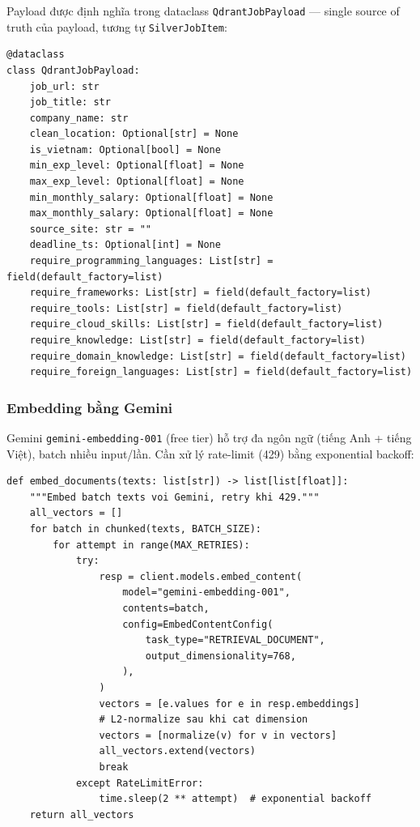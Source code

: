 Payload được định nghĩa trong dataclass \texttt{QdrantJobPayload} --- single
source of truth của payload, tương tự \texttt{SilverJobItem}:

\begin{lstlisting}[caption={\texttt{src/storage\_layer/Qdrant/schema/data\_class.py} --- QdrantJobPayload (trích đoạn)}, label={lst:qdrant-payload}]
@dataclass
class QdrantJobPayload:
    job_url: str
    job_title: str
    company_name: str
    clean_location: Optional[str] = None
    is_vietnam: Optional[bool] = None
    min_exp_level: Optional[float] = None
    max_exp_level: Optional[float] = None
    min_monthly_salary: Optional[float] = None
    max_monthly_salary: Optional[float] = None
    source_site: str = ""
    deadline_ts: Optional[int] = None
    require_programming_languages: List[str] = field(default_factory=list)
    require_frameworks: List[str] = field(default_factory=list)
    require_tools: List[str] = field(default_factory=list)
    require_cloud_skills: List[str] = field(default_factory=list)
    require_knowledge: List[str] = field(default_factory=list)
    require_domain_knowledge: List[str] = field(default_factory=list)
    require_foreign_languages: List[str] = field(default_factory=list)
\end{lstlisting}

\subsubsection{Embedding bằng Gemini}
\label{subsubsec:qdrant-embed}

Gemini \texttt{gemini-embedding-001} (free tier) hỗ trợ đa ngôn ngữ (tiếng Anh
+ tiếng Việt), batch nhiều input/lần. Cần xử lý rate-limit (429) bằng
exponential backoff:

\begin{lstlisting}[caption={\texttt{src/storage\_layer/Qdrant/scripts/embed.py} --- embed batch với backoff (trích đoạn)}, label={lst:qdrant-embed}]
def embed_documents(texts: list[str]) -> list[list[float]]:
    """Embed batch texts voi Gemini, retry khi 429."""
    all_vectors = []
    for batch in chunked(texts, BATCH_SIZE):
        for attempt in range(MAX_RETRIES):
            try:
                resp = client.models.embed_content(
                    model="gemini-embedding-001",
                    contents=batch,
                    config=EmbedContentConfig(
                        task_type="RETRIEVAL_DOCUMENT",
                        output_dimensionality=768,
                    ),
                )
                vectors = [e.values for e in resp.embeddings]
                # L2-normalize sau khi cat dimension
                vectors = [normalize(v) for v in vectors]
                all_vectors.extend(vectors)
                break
            except RateLimitError:
                time.sleep(2 ** attempt)  # exponential backoff
    return all_vectors
\end{lstlisting}

